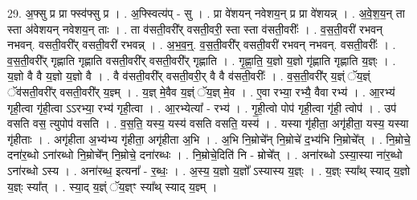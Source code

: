 \documentclass[17pt]{extarticle}
\begin{document}
29. अ॒फ्सु प्र प्रा फ्स्व॑फ्सु प्र । . अ॒फ्स्वित्य॑प् - सु । . प्रा वे॑शयन् नवेशय॒न् प्र प्रा वे॑शयन्न् । . अ॒वे॒श॒य॒न् ता स्ता अ॑वेशयन् नवेशय॒न् ताः । . ता व॑सती॒वरी᳚र् वसती॒वरी॒ स्ता स्ता व॑सती॒वरीः᳚ । . व॒स॒ती॒वरी॑ रभवन् नभवन्. वसती॒वरी᳚र् वसती॒वरी॑ रभवन्न् । . अ॒भ॒व॒न्॒. व॒स॒ती॒वरी᳚र् वसती॒वरी॑ रभवन् नभवन्. वसती॒वरीः᳚ । . व॒स॒ती॒वरी᳚र् गृह्णाति गृह्णाति वसती॒वरी᳚र् वसती॒वरी᳚र् गृह्णाति । . गृ॒ह्णा॒ति॒ य॒ज्ञो य॒ज्ञो गृ॑ह्णाति गृह्णाति य॒ज्ञ्ः । . य॒ज्ञो वै वै य॒ज्ञो य॒ज्ञो वै । . वै व॑सती॒वरी᳚र् वसती॒वरी॒र् वै वै व॑सती॒वरीः᳚ । . व॒स॒ती॒वरी᳚र् य॒ज्ञ्ं ॅय॒ज्ञ्ं ॅव॑सती॒वरी᳚र् वसती॒वरी᳚र् य॒ज्ञ्म् । . य॒ज्ञ् मे॒वैव य॒ज्ञ्ं ॅय॒ज्ञ् मे॒व । . ए॒वा रभ्या॒ रभ्यै॒ वैवा रभ्य॑ । . आ॒रभ्य॑ गृही॒त्वा गृ॑ही॒त्वा ऽऽरभ्या॒ रभ्य॑ गृही॒त्वा । . आ॒रभ्येत्या᳚ - रभ्य॑ । . गृ॒ही॒त्वो पोप॑ गृही॒त्वा गृ॑ही॒ त्वोप॑ । . उप॑ वसति वस॒ त्युपोप॑ वसति । . व॒स॒ति॒ यस्य॒ यस्य॑ वसति वसति॒ यस्य॑ । . यस्या गृ॑हीता॒ अगृ॑हीता॒ यस्य॒ यस्या गृ॑हीताः । . अगृ॑हीता अ॒भ्य॑भ्य गृ॑हीता॒ अगृ॑हीता अ॒भि । . अ॒भि नि॒म्रोचे᳚न् नि॒म्रोचे॑ द॒भ्य॑भि नि॒म्रोचे᳚त् । . नि॒म्रोचे॒ दना॑र॒ब्धो ऽना॑रब्धो नि॒म्रोचे᳚न् नि॒म्रोचे॒ दना॑रब्धः । . नि॒म्रोचे॒दिति॑ नि - म्रोचे᳚त् । . अना॑रब्धो ऽस्या॒स्या ना॑र॒ब्धो ऽना॑रब्धो ऽस्य । . अना॑रब्ध॒ इत्यना᳚ - र॒ब्धः॒ । . अ॒स्य॒ य॒ज्ञो य॒ज्ञो᳚ ऽस्यास्य य॒ज्ञ्ः । . य॒ज्ञ्ः स्या᳚थ् स्याद् य॒ज्ञो य॒ज्ञ्ः स्या᳚त् । . स्या॒द् य॒ज्ञ्ं ॅय॒ज्ञ्ꣳ स्या᳚थ् स्याद् य॒ज्ञ्म् । \newline
\end{document}
